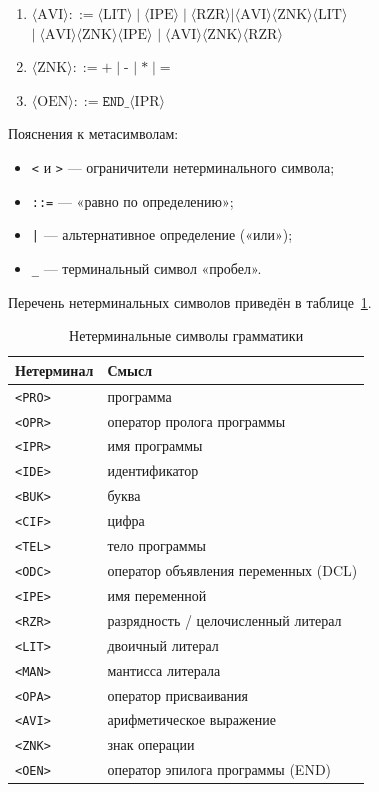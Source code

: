 \documentclass[a4paper,14pt]{extarticle}
\begin{document}
\begin{enumerate}
  \item $\langle\text{AVI}\rangle ::= \langle\text{LIT}\rangle \mid \langle\text{IPE}\rangle \mid $\textit{$\langle\text{RZR}\rangle$}$\mid \langle\text{AVI}\rangle\langle\text{ZNK}\rangle\langle\text{LIT}\rangle$\\
        $\mid\; \langle\text{AVI}\rangle\langle\text{ZNK}\rangle\langle\text{IPE}\rangle$
        \textit{$\mid\; \langle\text{AVI}\rangle\langle\text{ZNK}\rangle\langle\text{RZR}\rangle$}
  \item $\langle\text{ZNK}\rangle ::= \texttt{+} \mid \texttt{-}$ \textit{$\mid\; \texttt{*} \mid \texttt{=}$}
  \item $\langle\text{OEN}\rangle ::= \texttt{END\_}\langle\text{IPR}\rangle$
\end{enumerate}

Пояснения к метасимволам:
\begin{itemize}
  \item \texttt{<} и \texttt{>} — ограничители нетерминального символа;
  \item \texttt{::=} — «равно по определению»;
  \item \texttt{|} — альтернативное определение («или»);
  \item \texttt{\_} — терминальный символ «пробел».
\end{itemize}

Перечень нетерминальных символов приведён в таблице~\ref{tab:nonterm}.

\begin{table}[H]
\centering
\caption{Нетерминальные символы грамматики}
\label{tab:nonterm}
\begin{tabularx}{\textwidth}{|l|X|}
  \hline
  \textbf{Нетерминал} & \textbf{Смысл} \\
  \hline
  \texttt{<PRO>} & программа \\
  \texttt{<OPR>} & оператор пролога программы \\
  \texttt{<IPR>} & имя программы \\
  \texttt{<IDE>} & идентификатор \\
  \texttt{<BUK>} & буква \\
  \texttt{<CIF>} & цифра \\
  \texttt{<TEL>} & тело программы \\
  \texttt{<ODC>} & оператор объявления переменных (DCL) \\
  \texttt{<IPE>} & имя переменной \\
  \texttt{<RZR>} & разрядность / целочисленный литерал \\
  \texttt{<LIT>} & двоичный литерал \\
  \texttt{<MAN>} & мантисса литерала \\
  \texttt{<OPA>} & оператор присваивания \\
  \texttt{<AVI>} & арифметическое выражение \\
  \texttt{<ZNK>} & знак операции \\
  \texttt{<OEN>} & оператор эпилога программы (END) \\
  \hline
\end{tabularx}
\end{table}
\end{document}
